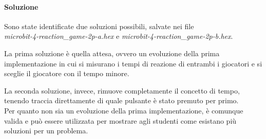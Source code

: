 \documentclass[../../docenti.tex]{subfiles}
\begin{document}
\paragraph{Soluzione}
Sono state identificate due soluzioni possibili, salvate nei file \\
\textit{microbit-4-reaction\_game-2p-a.hex} e \textit{microbit-4-reaction\_game-2p-b.hex}.

La prima soluzione è quella attesa, ovvero un evoluzione della prima implementazione in cui si misurano i tempi di reazione di entrambi i giocatori e si sceglie il giocatore con  il tempo minore.

La seconda soluzione, invece, rimuove completamente il concetto di tempo, tenendo traccia direttamente di quale pulsante è stato premuto per primo.\\
Per quanto non sia un evoluzione della prima implementazione, è comunque valida e può essere utilizzata per mostrare agli studenti come esistano più soluzioni per un problema.
\end{document}
